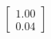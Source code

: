 \documentclass[preview]{standalone}
\begin{document}
\begin{align*}
\begin{bmatrix} 1.00 \\ 0.04 \end{bmatrix}
\end{align*}
\end{document}
